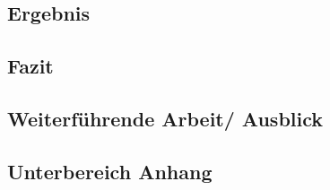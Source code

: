 \documentclass[a4paper, 12pt, twoside, headsepline=true]{scrartcl} %
\begin{document}
\subsection{Ergebnis}

\subsection{Fazit}

\subsection{Weiterführende Arbeit/ Ausblick}

\newpage

\printbibliography[heading=none]
\newpage
{}
\subsection*{Unterbereich Anhang}
\end{document}
